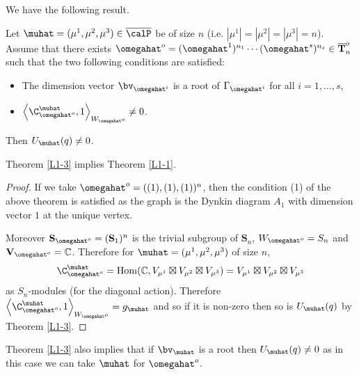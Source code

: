 We have the following result.

\begin{theo} \cite[Corollary 5]{L1} Let $\muhat=(\mu^1,\mu^2,\mu^3)\in\overline{\calP}$ be of size $n$ (i.e. $|\mu^1|=|\mu^2|=|\mu^3|=n$). Assume that there exists $\omegahat^o=(\omegahat^1)^{n_1}\cdots(\omegahat^s)^{n_s}\in\overline{\mathbf{T}}_n^o$ such that the two following conditions are satisfied:
\begin{itemize}
\item[(1)]The dimension vector $\bv_{\omegahat^i}$ is a root of $\Gamma_{\omegahat^i}$ for all $i=1,\dots,s$, 
\item[(2)] $\left\langle \C^\muhat_{\omegahat^o},1\right\rangle_{W_{\omegahat^o}}\neq 0$.
\end{itemize}
Then $U_\muhat(q)\neq 0$.
	\label{L1-3}\end{theo}

\begin{lemm}Theorem \ref{L1-3} implies Theorem \ref{L1-1}.
\end{lemm}

\begin{proof} If we take $\omegahat^o=((1),(1),(1))^n$, then the condition (1) of the above theorem  is satisfied as the graph is the Dynkin diagram $A_1$ with dimension vector $1$ at the unique vertex. 
	
	Moreover ${\mathbf{S}}_{\omegahat^o}=({\mathbf{S}}_1)^n$ is the trivial subgroup of ${\mathbf{S}}_n$, $W_{\omegahat^o}=S_n$ and ${\mathbf{V}}_{\omegahat^o}=\mathbb{C}$. Therefore for $\muhat=(\mu^1,\mu^2,\mu^3)$ of size $n$,
	$$
	\C^\muhat_{\omegahat^o}={\rm Hom}(\mathbb{C},V_{\mu^1}\boxtimes V_{\mu^2}\boxtimes V_{\mu^3})=V_{\mu^1}\boxtimes V_{\mu^2}\boxtimes V_{\mu^3}
	$$
	as $S_n$-modules (for the diagonal action). Therefore $\left\langle \C^\muhat_{\omegahat^o},1\right\rangle_{W_{\omegahat^o}}=g_\muhat$ and so if it is non-zero then so is $U_\muhat(q)$ by Theorem \ref{L1-3}.  
\end{proof}




\begin{rema}Theorem \ref{L1-3} also implies that if $\bv_\muhat$ is a root then $U_\muhat(q)\neq 0$ as in this case we can take $\muhat$ for $\omegahat^o$.
	\label{L1-2}\end{rema}



